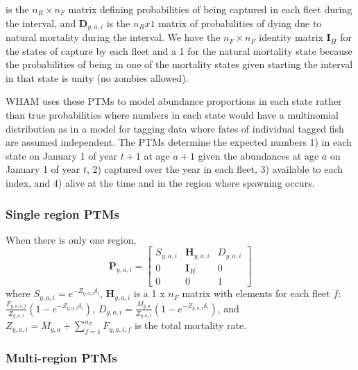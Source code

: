 \documentclass[
]{article}
\begin{document}
is the \(n_R \times n_F\) matrix defining probabilities of being captured in each fleet during the interval, and \(\mathbf{D}_{y,a,i}\) is the \(n_R x 1\) matrix of probabilities of dying due to natural mortality during the interval. We have the \(n_F\times n_F\) identity matrix \(\mathbf{I}_{H}\) for the states of capture by each fleet and a 1 for the natural mortality state because the probabilities of being in one of the mortality states given starting the interval in that state is unity (no zombies allowed).

WHAM uses these PTMs to model abundance proportions in each state rather than true probabilities where numbers in each state would have a multinomial distribution as in a model for tagging data where fates of individual tagged fish are assumed independent. The PTMs determine the expected numbers 1) in each state on January 1 of year \(t+1\) at age \(a+1\) given the abundances at age \(a\) on January 1 of year \(t\), 2) captured over the year in each fleet, 3) available to each index, and 4) alive at the time and in the region where spawning occurs.

\hypertarget{single-region-ptms}{%
\subsubsection*{Single region PTMs}\label{single-region-ptms}}

When there is only one region,
\begin{equation}\label{eq:ptm_1_region}
\mathbf{P}_{y,a,i} = 
  \begin{bmatrix}
     S_{y,a,i} & \mathbf{H}_{y,a,i} & D_{y,a,i} \\
     0 & \mathbf{I}_{H} & 0\\
     0 & 0 & 1
  \end{bmatrix}
\end{equation}
where \(S_{y,a,i} = e^{-Z_{y,a,i}\delta_i}\), \(\mathbf{H}_{y,a,i}\) is a 1 x \(n_F\) matrix with elements for each fleet \(f\): \(\frac{F_{y,a,i,f}}{Z_{y,a,i}}\left(1 - e^{-Z_{y,a,i}\delta_i}\right)\), \(D_{y,a,i} = \frac{M_{y,a}}{Z_{y,a,i}}\left(1 - e^{-Z_{y,a,i}\delta_i}\right)\), and \(Z_{y,a,i} = M_{y,a} + \sum^{n_F}_{f=1} F_{y,a,i,f}\) is the total mortality rate.

\hypertarget{multi-region-ptms}{%
\subsubsection*{Multi-region PTMs}\label{multi-region-ptms}}
\end{document}
